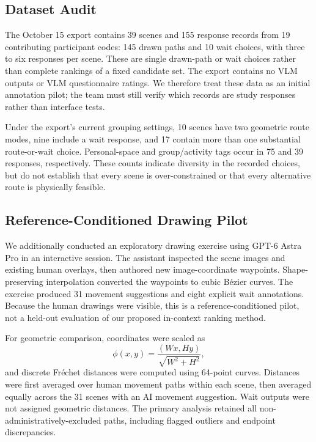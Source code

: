 \subsection{Dataset Audit}
The October 15 export contains 39 scenes and 155 response records from 19
contributing participant codes: 145 drawn paths and 10 wait choices, with
three to six responses per scene. These are single drawn-path or wait
choices rather than complete rankings of a fixed candidate set. The export
contains no VLM outputs or VLM questionnaire ratings. We therefore treat
these data as an initial annotation pilot; the team must still verify which
records are study responses rather than interface tests.

Under the export's current grouping settings, 10 scenes have two geometric
route modes, nine include a wait response, and 17 contain more than one
substantial route-or-wait choice. Personal-space and group/activity tags
occur in 75 and 39 responses, respectively. These counts indicate diversity
in the recorded choices, but do not establish that every scene is
over-constrained or that every alternative route is physically feasible.

\subsection{Reference-Conditioned Drawing Pilot}
We additionally conducted an exploratory drawing exercise using GPT-6
Astra Pro in an interactive session. The assistant inspected the scene
images and existing human overlays, then authored new image-coordinate
waypoints. Shape-preserving interpolation converted the waypoints to
cubic B\'ezier curves. The exercise produced 31 movement suggestions and
eight explicit wait annotations. Because the human drawings were visible,
this is a reference-conditioned pilot, not a held-out evaluation of our
proposed in-context ranking method.

For geometric comparison, coordinates were scaled as
\begin{equation}
\phi(x,y)=\frac{(Wx,Hy)}{\sqrt{W^2+H^2}},
\end{equation}
and discrete Fr\'echet distances were computed using 64-point curves.
Distances were first averaged over human movement paths within each scene,
then averaged equally across the 31 scenes with an AI movement suggestion.
Wait outputs were not assigned geometric distances. The primary analysis
retained all non-administratively-excluded paths, including flagged
outliers and endpoint discrepancies.

